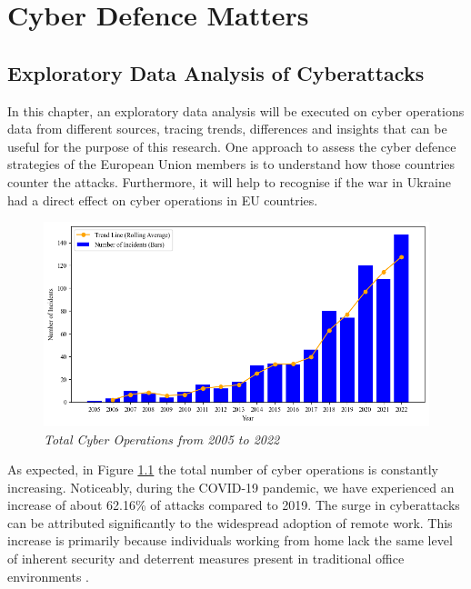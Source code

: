 \chapter{Cyber Defence Matters}

\section{Exploratory Data Analysis of Cyberattacks}

In this chapter, an exploratory data analysis will be executed on cyber operations data from different sources, tracing trends, differences and insights that can be useful for the purpose of this research. One approach to assess the cyber defence strategies of the European Union members is to understand how those countries counter the attacks. Furthermore, it will help to recognise if the war in Ukraine had a direct effect on cyber operations in EU countries. 

\begin{figure}[H]
    \centering
    \includegraphics[width=1\textwidth]{Images/total_cyber.png}
    \caption{\textit{Total Cyber Operations from 2005 to 2022}}
    \label{total_cyber.png}
\end{figure}

As expected, in Figure \ref{total_cyber.png} the total number of cyber operations is constantly increasing. Noticeably, during the COVID-19 pandemic, we have experienced an increase of about 62.16\% of attacks compared to 2019. The surge in cyberattacks can be attributed significantly to the widespread adoption of remote work. This increase is primarily because individuals working from home lack the same level of inherent security and deterrent measures present in traditional office environments \parencite{nabe_2020_impact}. 

